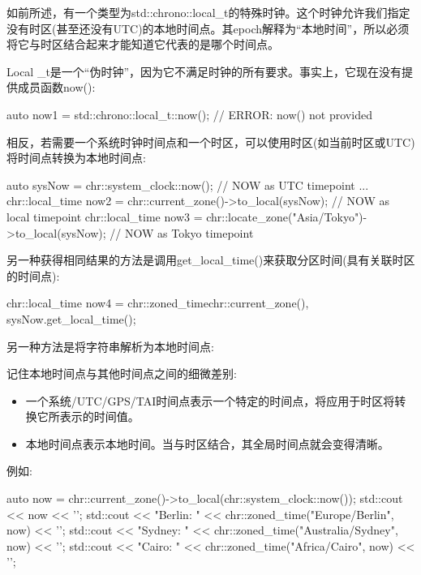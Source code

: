 如前所述，有一个类型为std::chrono::local\_t的特殊时钟。这个时钟允许我们指定没有时区(甚至还没有UTC)的本地时间点。其epoch解释为“本地时间”，所以必须将它与时区结合起来才能知道它代表的是哪个时间点。

Local \_t是一个“伪时钟”，因为它不满足时钟的所有要求。事实上，它现在没有提供成员函数now():

\begin{cpp}
auto now1 = std::chrono::local_t::now(); // ERROR: now() not provided
\end{cpp}

相反，若需要一个系统时钟时间点和一个时区，可以使用时区(如当前时区或UTC)将时间点转换为本地时间点:

\begin{cpp}
auto sysNow = chr::system_clock::now(); // NOW as UTC timepoint
...
chr::local_time now2
	= chr::current_zone()->to_local(sysNow); // NOW as local timepoint
chr::local_time now3
	= chr::locate_zone("Asia/Tokyo")->to_local(sysNow); // NOW as Tokyo timepoint
\end{cpp}

另一种获得相同结果的方法是调用get\_local\_time()来获取分区时间(具有关联时区的时间点):

\begin{cpp}
chr::local_time now4 = chr::zoned_time{chr::current_zone(),
										sysNow}.get_local_time();
\end{cpp}

另一种方法是将字符串解析为本地时间点:


记住本地时间点与其他时间点之间的细微差别:

\begin{itemize}
\item 
一个系统/UTC/GPS/TAI时间点表示一个特定的时间点，将应用于时区将转换它所表示的时间值。

\item 
本地时间点表示本地时间。当与时区结合，其全局时间点就会变得清晰。
\end{itemize}

例如:

\begin{cpp}
auto now = chr::current_zone()->to_local(chr::system_clock::now());
std::cout << now << '\n';
std::cout << "Berlin: " << chr::zoned_time("Europe/Berlin", now) << '\n';
std::cout << "Sydney: " << chr::zoned_time("Australia/Sydney", now) << '\n';
std::cout << "Cairo: " << chr::zoned_time("Africa/Cairo", now) << '\n';
\end{cpp}

